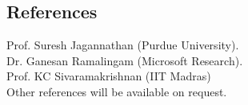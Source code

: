 \documentclass[margin,line]{res}
\begin{document}
\begin{resume}
\section{References}
Prof. Suresh Jagannathan (Purdue University).\\
Dr. Ganesan Ramalingam (Microsoft Research). \\
Prof. KC Sivaramakrishnan (IIT Madras)\\
Other references will be available on request.
\end{resume} 
\end{document}
